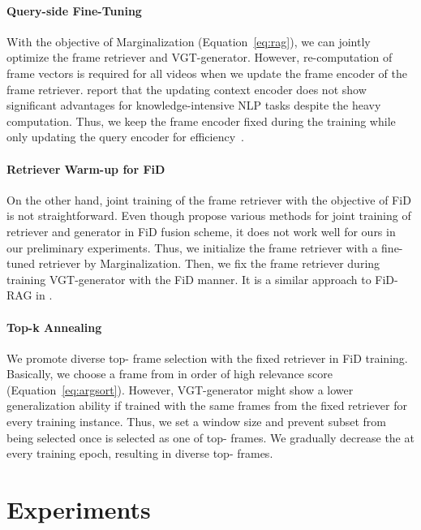 \documentclass{article}
\begin{document}
\paragraph{Query-side Fine-Tuning}

With the objective of Marginalization (Equation~\ref{eq:rag}), we can jointly optimize the frame retriever and VGT-generator. However, re-computation of frame vectors is required for all videos when we update the frame encoder of the frame retriever. \citet{lewis2020retrieval, izacard2022few} report that the updating context encoder does not show significant advantages for knowledge-intensive NLP tasks despite the heavy computation. Thus, we keep the frame encoder  fixed during the training while only updating the query encoder  for efficiency~\cite{lewis2020retrieval, izacard2022few}.


\paragraph{Retriever Warm-up for FiD}

On the other hand, joint training of the frame retriever with the objective of FiD is not straightforward. Even though \citet{izacard2022few} propose various methods for joint training of retriever and generator in FiD fusion scheme, it does not work well for ours in our preliminary experiments. Thus, we initialize the frame retriever with a fine-tuned retriever by Marginalization. Then, we fix the frame retriever during training VGT-generator with the FiD manner. It is a similar approach to FiD-RAG in \citet{shuster2021retrieval}.


\paragraph{Top-k Annealing}

We promote diverse top- frame selection with the fixed retriever in FiD training. Basically, we choose a frame from  in order of high relevance score (Equation~\ref{eq:argsort}). However, VGT-generator might show a lower generalization ability if trained with the same  frames from the fixed retriever for every training instance. Thus, we set a window size  and prevent subset  from being selected once  is selected as one of top- frames. We gradually decrease the  at every training epoch, resulting in diverse top- frames.

 \section{Experiments}
\end{document}
